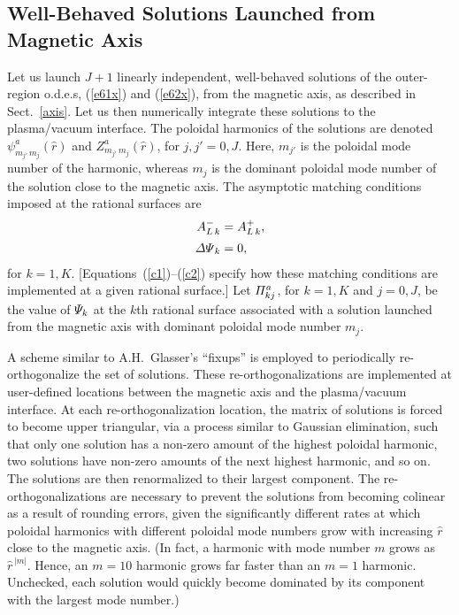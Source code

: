 \documentclass[12pt,prb,aps]{revtex4-1}
\begin{document}
\subsection{Well-Behaved Solutions Launched from Magnetic Axis}\label{axisl}
Let us launch $J+1$ linearly independent, well-behaved solutions of the outer-region o.d.e.s, (\ref{e61x}) and (\ref{e62x}), from the
magnetic axis, as described in Sect.~\ref{axis}. Let us then numerically integrate these solutions to the plasma/vacuum interface. The poloidal harmonics of
the solutions are denoted $\psi^a_{m_{j'}\,m_j}(\hat{r})$ and $Z^a_{m_{j'}\,m_j}(\hat{r})$, for $j,j'=0,J$. Here,
$m_{j'}$ is the poloidal mode number of the harmonic, whereas $m_j$ is the dominant poloidal mode number of the solution close to the
magnetic axis. The asymptotic matching conditions imposed at the rational surfaces are
\begin{align}
A_{L\,k}^{-} &= A_{L\,k}^+,\\[0.5ex]
{\mit\Delta\Psi}_k &= 0,
\end{align}
for $k=1,K$. [Equations~(\ref{c1})--(\ref{c2}) specify how these matching conditions are implemented at a given rational surface.]
Let ${\mit\Pi}_{kj}^a$, for   $k=1,K$ and $j=0,J$,  be the value of ${\mit\Psi}_k$ at the $k$th rational surface associated with a solution launched
from the magnetic axis with dominant poloidal mode number $m_j$. 

A scheme similar to A.H.~Glasser's ``fixups'' \cite{ham} is employed to periodically re-orthogonalize the set of solutions. These  re-orthogonalizations are implemented at user-defined locations between the magnetic axis and the plasma/vacuum interface.  At each re-orthogonalization location, the matrix of solutions is forced to become upper triangular, via a process similar to Gaussian elimination, such that only one solution has a non-zero amount of the highest poloidal  harmonic, two solutions have non-zero amounts of the next highest harmonic, and so on. The solutions are then renormalized to their largest component. 
 The re-orthogonalizations are
 necessary to prevent the solutions from becoming colinear as a result of rounding errors, given the significantly
 different rates at which poloidal harmonics with different poloidal mode numbers grow with increasing $\hat{r}$  close to the magnetic axis. (In fact, a
 harmonic with mode number $m$ grows as $\hat{r}^{\,|m|}$. Hence, an $m=10$ harmonic  grows far faster than an $m=1$ harmonic. Unchecked, each solution
 would quickly become dominated by its component with the largest mode number.)
\end{document}
